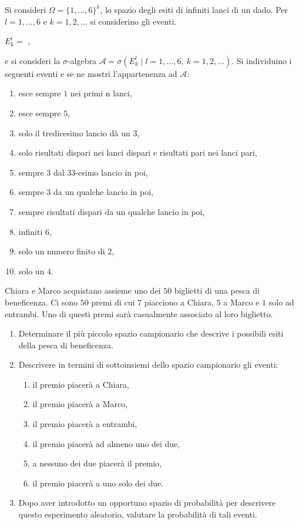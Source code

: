Si consideri $\Omega =\{1,\dots ,6\}^{k}$, lo spazio degli esiti di infiniti lanci di un dado. Per $l=1,\dots ,6$ e $k=1,2,\dots $ si considerino gli eventi.
\begin{center}
	$E_{k}^{l} =$ ,
\end{center}
e si consideri la $\sigma $-algebra $\mathcal{A} =\sigma \left(E_{k}^{l} \mid l=1,\dots ,6,\ k=1,2,\dots \right)$. Si individuino i seguenti eventi e se ne mostri l'appartenenza ad $\mathcal{A}$:
\begin{enumerate}
	\item esce sempre $1$ nei primi n lanci,
	\item esce sempre $5$,
	\item solo il tredicesimo lancio dà un $3$,
	\item solo risultati dispari nei lanci dispari e risultati pari nei lanci pari,
	\item sempre $3$ dal $33$-esimo lancio in poi,
	\item sempre $3$ da un qualche lancio in poi,
	\item sempre risultati dispari da un qualche lancio in poi,
	\item infiniti $6$,
	\item solo un numero finito di $2$,
	\item solo un $4$.
\end{enumerate}

\Esercizio{}

Chiara e Marco acquistano assieme uno dei $50$ biglietti di una pesca di beneficenza. Ci sono $50$ premi di cui $7$ piacciono a Chiara, $5$ a Marco e $1$ solo ad entrambi. Uno di questi premi sarà casualmente associato al loro biglietto.
\begin{enumerate}
	\item Determinare il più piccolo spazio campionario che descrive i possibili esiti della pesca di beneficenza.
	\item Descrivere in termini di sottoinsiemi dello spazio campionario gli eventi:
	\begin{enumerate}
		\item il premio piacerà a Chiara,
		\item il premio piacerà a Marco,
		\item il premio piacerà a entrambi,
		\item il premio piacerà ad almeno uno dei due,
		\item a nessuno dei due piacerà il premio,
		\item il premio piacerà a uno solo dei due.
	\end{enumerate}
	\item Dopo aver introdotto un opportuno spazio di probabilità per descrivere questo esperimento aleatorio, valutare la probabilità di tali eventi.
\end{enumerate}

